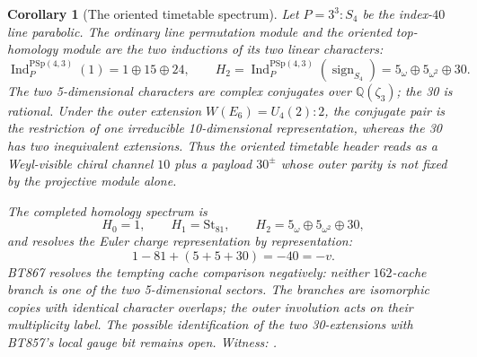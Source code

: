 \documentclass[11pt]{article}
\newtheorem{corollary}[theorem]{Corollary}
\newcommand{\PSp}{\mathrm{PSp}}
\begin{document}
\begin{corollary}[The oriented timetable spectrum]
Let $P=3^3{:}S_4$ be the index-$40$ line parabolic.  The ordinary
line permutation module and the oriented top-homology module are the
two inductions of its two linear characters:
\[
 \operatorname{Ind}_P^{\PSp(4,3)}(1)=1\oplus15\oplus24,
 \qquad
 H_2=\operatorname{Ind}_P^{\PSp(4,3)}(\operatorname{sign}_{S_4})
   =5_{\omega}\oplus5_{\omega^2}\oplus30.
\]
The two 5-dimensional characters are complex conjugates over
$\mathbb Q(\zeta_3)$; the 30 is rational.  Under the outer extension
$W(E_6)=U_4(2){:}2$, the conjugate pair is the restriction of one
irreducible 10-dimensional representation, whereas the 30 has two
inequivalent extensions.  Thus the oriented timetable header reads
as a Weyl-visible chiral channel $10$ plus a payload $30^{\pm}$ whose
outer parity is not fixed by the projective module alone.

The completed homology spectrum is
\[
 H_0=1,\qquad H_1=\mathrm{St}_{81},\qquad
 H_2=5_{\omega}\oplus5_{\omega^2}\oplus30,
\]
and resolves the Euler charge representation by representation:
\[
 1-81+(5+5+30)=-40=-v.
\]
BT867 resolves the tempting cache comparison negatively: neither
$162$-cache branch is one of the two 5-dimensional sectors.  The
branches are isomorphic copies with identical character overlaps; the
outer involution acts on their multiplicity label.  The possible
identification of the two 30-extensions with BT857's local gauge bit
remains open.
\emph{Witness:
.}
\end{corollary}
\end{document}
